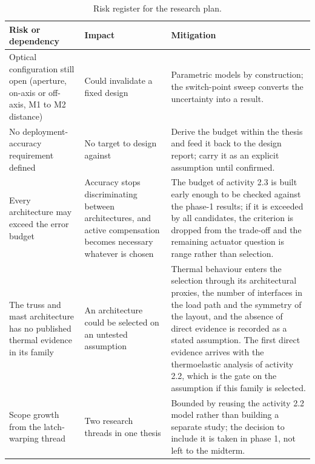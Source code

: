 \begin{table}[H]
    \centering
    \caption{Risk register for the research plan.}
    \label{tab:risks}
    \small
    \begin{tabularx}{\textwidth}{XXX}
        \toprule
        Risk or dependency & Impact & Mitigation \\
        \midrule
        
        Optical configuration still open (aperture, on-axis or off-axis, M1 to M2 distance) & Could invalidate a fixed design & Parametric models by construction; the switch-point sweep converts the uncertainty into a result. \\
        \addlinespace
        
        No deployment-accuracy requirement defined & No target to design against & Derive the budget within the thesis and feed it back to the design report; carry it as an explicit assumption until confirmed. \\
        \addlinespace
        
        Every architecture may exceed the error budget & Accuracy stops discriminating between architectures, and active compensation becomes necessary whatever is chosen & The budget of activity 2.3 is built early enough to be checked against the phase-1 results; if it is exceeded by all candidates, the criterion is dropped from the trade-off and the remaining actuator question is range rather than selection. \\
        \addlinespace
        
        The truss and mast architecture has no published thermal evidence in its family & An architecture could be selected on an untested assumption & Thermal behaviour enters the selection through its architectural proxies, the number of interfaces in the load path and the symmetry of the layout, and the absence of direct evidence is recorded as a stated assumption. The first direct evidence arrives with the thermoelastic analysis of activity 2.2, which is the gate on the assumption if this family is selected. \\
        \addlinespace
        
        Scope growth from the latch-warping thread & Two research threads in one thesis & Bounded by reusing the activity 2.2 model rather than building a separate study; the decision to include it is taken in phase 1, not left to the midterm. \\
        
        \bottomrule
    \end{tabularx}
\end{table}
